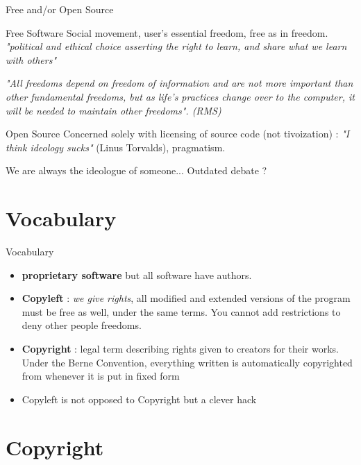 \documentclass{beamer}
\begin{document}
\begin{frame}{Free and/or Open Source}

  \begin{block}{Free Software}
    Social movement, user's essential freedom, free as in freedom. \textit{"political and ethical choice asserting the right to learn, and share what we learn with others"}
  \end{block}

\textit{"All freedoms depend on freedom of information and are not more important than other fundamental freedoms, but as life's practices change over to the computer, it will be needed to maintain other freedoms". (RMS)}

  \begin{block}{Open Source}
    Concerned solely with licensing of source code (not tivoization) :  \textit{"I think ideology sucks"} (Linus Torvalds), pragmatism.
  \end{block}

We are always the ideologue of someone... Outdated debate ?
\end{frame}

\section{Vocabulary}


\begin{frame}{Vocabulary}

  \begin{itemize}
  \item \textbf{proprietary software} but all software have authors.
  \item \textbf{Copyleft} : \textit{we give rights}, all modified and extended versions of the program must be free as well, under the same terms. You cannot add restrictions to deny other people freedoms.
  \item \textbf{Copyright} :  legal term describing rights given to creators for their works. Under the Berne Convention, everything written is automatically copyrighted from whenever it is put in fixed form
  \item Copyleft is not opposed to Copyright but a clever hack
  \end{itemize}
\end{frame}

\section{Copyright}
\end{document}
